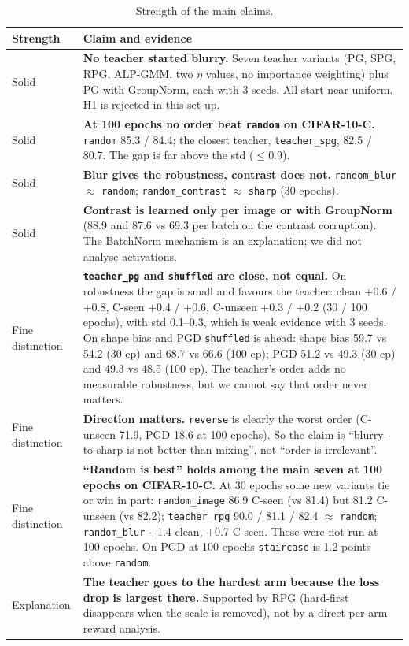 \documentclass[a4paper,12pt]{report}
\newcommand{\cond}[1]{\texttt{#1}}
\begin{document}
\begin{table}[htbp]
\caption{Strength of the main claims.}
\label{tab:sure}
\begin{center}
\footnotesize
\renewcommand{\arraystretch}{1.05}
\begin{tabular}{|P{2.1cm}|P{12.2cm}|} \hline
\textbf{Strength} & \textbf{Claim and evidence} \\ \hline
Solid & \textbf{No teacher started blurry.} Seven teacher variants (PG, SPG, RPG, ALP-GMM, two $\eta$ values, no importance weighting) plus PG with GroupNorm, each with 3 seeds. All start near uniform. H1 is rejected in this set-up. \\ \hline
Solid & \textbf{At 100 epochs no order beat \cond{random} on CIFAR-10-C.} \cond{random} 85.3 / 84.4; the closest teacher, \cond{teacher\_spg}, 82.5 / 80.7. The gap is far above the std ($\le$0.9). \\ \hline
Solid & \textbf{Blur gives the robustness, contrast does not.} \cond{random\_blur} $\approx$ \cond{random}; \cond{random\_contrast} $\approx$ \cond{sharp} (30 epochs). \\ \hline
Solid & \textbf{Contrast is learned only per image or with GroupNorm} (88.9 and 87.6 vs 69.3 per batch on the contrast corruption). The BatchNorm mechanism is an explanation; we did not analyse activations. \\ \hline
Fine distinction & \textbf{\cond{teacher\_pg} and \cond{shuffled} are close, not equal.} On robustness the gap is small and favours the teacher: clean +0.6 / +0.8, C-seen +0.4 / +0.6, C-unseen +0.3 / +0.2 (30 / 100 epochs), with std 0.1--0.3, which is weak evidence with 3 seeds. On shape bias and PGD \cond{shuffled} is ahead: shape bias 59.7 vs 54.2 (30 ep) and 68.7 vs 66.6 (100 ep); PGD 51.2 vs 49.3 (30 ep) and 49.3 vs 48.5 (100 ep). The teacher's order adds no measurable robustness, but we cannot say that order never matters. \\ \hline
Fine distinction & \textbf{Direction matters.} \cond{reverse} is clearly the worst order (C-unseen 71.9, PGD 18.6 at 100 epochs). So the claim is ``blurry-to-sharp is not better than mixing'', not ``order is irrelevant''. \\ \hline
Fine distinction & \textbf{``Random is best'' holds among the main seven at 100 epochs on CIFAR-10-C.} At 30 epochs some new variants tie or win in part: \cond{random\_image} 86.9 C-seen (vs 81.4) but 81.2 C-unseen (vs 82.2); \cond{teacher\_rpg} 90.0 / 81.1 / 82.4 $\approx$ \cond{random}; \cond{random\_blur} +1.4 clean, +0.7 C-seen. These were not run at 100 epochs. On PGD at 100 epochs \cond{staircase} is 1.2 points above \cond{random}. \\ \hline
Explanation & \textbf{The teacher goes to the hardest arm because the loss drop is largest there.} Supported by RPG (hard-first disappears when the scale is removed), not by a direct per-arm reward analysis. \\ \hline
\end{tabular}
\end{center}
\end{table}
\end{document}
